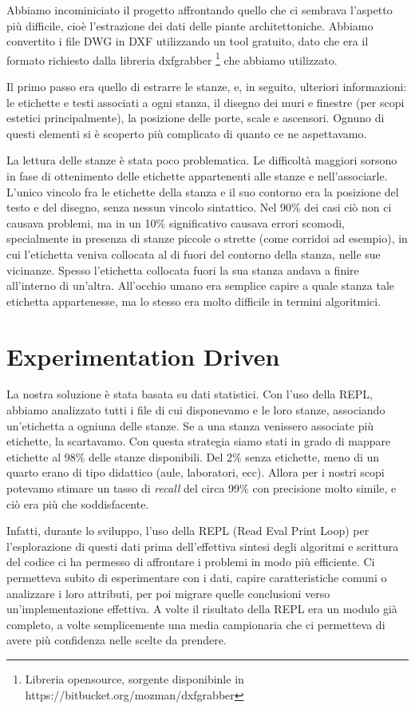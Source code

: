 \documentclass[12pt]{report}
\begin{document}
Abbiamo incominiciato il progetto affrontando quello che ci sembrava l'aspetto più difficile, cioè l'estrazione dei dati delle piante architettoniche. Abbiamo convertito i file DWG in DXF utilizzando un tool gratuito, dato che era il formato richiesto dalla libreria dxfgrabber \footnote{Libreria opensource, sorgente disponibinle in https://bitbucket.org/mozman/dxfgrabber} che abbiamo utilizzato.

Il primo passo era quello di estrarre le stanze, e, in seguito, ulteriori informazioni: le etichette e testi associati a ogni stanza, il disegno dei muri e finestre (per scopi estetici principalmente), la posizione delle porte, scale e ascensori. Ognuno di questi elementi si è scoperto più complicato di quanto ce ne aspettavamo.

La lettura delle stanze è stata poco problematica. Le difficoltà maggiori sorsono in fase di ottenimento delle etichette appartenenti alle stanze e nell'associarle. L'unico vincolo fra le etichette della stanza e il suo contorno era la posizione del testo e del disegno, senza nessun vincolo sintattico. Nel 90\% dei casi ciò non ci causava problemi, ma in un 10\% significativo causava errori scomodi, specialmente in presenza di stanze piccole o strette (come corridoi ad esempio), in cui l'etichetta veniva collocata al di fuori del contorno della stanza, nelle sue vicinanze. Spesso l'etichetta collocata fuori la sua stanza andava a finire all'interno di un'altra. All'occhio umano era semplice capire a quale stanza tale etichetta appartenesse, ma lo stesso era molto difficile in termini algoritmici.


\section{Experimentation Driven}

La nostra soluzione è stata basata su dati statistici. Con l'uso della REPL, abbiamo analizzato tutti i file di cui disponevamo e le loro stanze, associando un'etichetta a ogniuna delle stanze. Se a una stanza venissero associate più etichette, la scartavamo. Con questa strategia siamo stati in grado di mappare etichette al 98\% delle stanze disponibili. Del 2\% senza etichette, meno di un quarto erano di tipo didattico (aule, laboratori, ecc). Allora per i nostri scopi potevamo stimare un tasso di \textit{recall} del circa 99\% con precisione molto simile, e ciò era più che soddisfacente.

Infatti, durante lo sviluppo, l'uso della REPL (Read Eval Print Loop) per l'esplorazione di questi dati prima dell'effettiva sintesi degli algoritmi e scrittura del codice ci ha permesso di affrontare i problemi in modo più efficiente. Ci permetteva subito di esperimentare con i dati, capire caratteristiche comuni o analizzare i loro attributi, per poi migrare quelle conclusioni verso un'implementazione effettiva. A volte il risultato della REPL era un modulo già completo, a volte semplicemente una media campionaria che ci permetteva di avere più confidenza nelle scelte da prendere.
\end{document}
